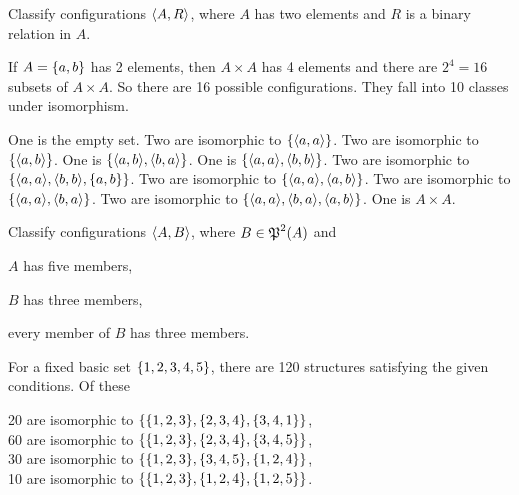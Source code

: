 \begin{exercise}
Classify configurations $\left\langle A, R\right\rangle$, where $A$ has two elements and $R$ is a binary relation
in $A$.
\end{exercise}

\begin{solution}
If $A=\left\{a,b\right\}$ has 2 elements, then $A\times A$ has 4 elements and there are $2^4=16$ subsets
of $A\times A$. So there are 16 possible configurations. They fall into 10 classes under isomorphism.

One is the empty set.
Two are isomorphic to $\left\{\left\langle a,a\right\rangle\right\}$.
Two are isomorphic to $\left\{\left\langle a,b\right\rangle\right\}$.
One is $\set{\aprn{a,b},\aprn{b,a}}$.
One is $\set{\aprn{a,a},\aprn{b,b}}$.
Two are isomorphic to $\set{\aprn{a,a},\aprn{b,b},\set{a,b}}$.
Two are isomorphic to $\set{\aprn{a,a},\aprn{a,b}}$.
Two are isomorphic to $\set{\aprn{a,a},\aprn{b,a}}$.
Two are isomorphic to $\set{\aprn{a,a},\aprn{b,a},\aprn{a,b}}$.
One is $A\times A$.
\end{solution}

\begin{exercise}
Classify configurations $\left\langle A,B\right\rangle$, where $B \in\operatorname{\mathfrak{P}}^2(A)$ and
\begin{enumalpha}
    \item $A$ has five members,
    \item $B$ has three members,
    \item every member of $B$ has three members.
\end{enumalpha}
\end{exercise}

\begin{solution}
For a fixed basic set $\left\{1,2,3,4,5\right\}$, there are 120 structures satisfying the given conditions.
Of these
\begin{center}
    20 are isomorphic to $\set{\set{1,2,3},\set{2,3,4},\set{3,4,1}}$,\\
    60 are isomorphic to $\set{\set{1,2,3},\set{2,3,4},\set{3,4,5}}$,\\
    30 are isomorphic to $\set{\set{1,2,3},\set{3,4,5},\set{1,2,4}}$,\\
    10 are isomorphic to $\set{\set{1,2,3},\set{1,2,4},\set{1,2,5}}$.
\end{center}
\end{solution}
